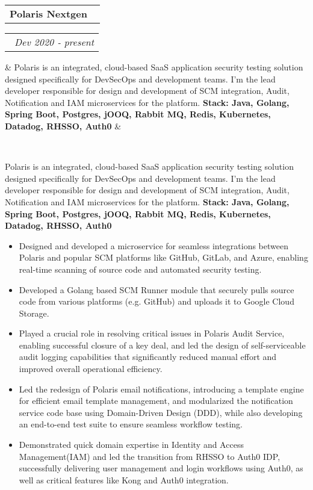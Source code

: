 \documentclass[14pt,a4paper,sans]{moderncv}
\makeatletter
\newcommand*{\customcventry}[7][.13em]{
    \begin{tabular}{@{}l}
    {\bfseries #4} \
        {\itshape #3}
    \end{tabular}
    \hfill
    \begin{tabular}{l@{}}
    {\bfseries #5} \
        {\itshape #2}
    \end{tabular}
    \ifx
        &#7&%
    \else
            {\
        \begin{minipage}{\maincolumnwidth}%
        \small#7%
        \end{minipage}}
    \fi%
    \par\addvspace{#1}}
\makeatother
\begin{document}
    \customcventry{Dev 2020 ‐ present}{}{Polaris Nextgen}{}{}{
            {Polaris is an integrated, cloud-based SaaS application security testing solution designed specifically for DevSecOps and development teams.
        I'm the lead developer responsible for design and development of SCM integration, Audit, Notification and IAM microservices for the platform.\newline{} \newline{}}
            {\textbf{Stack: Java, Golang, Spring Boot, Postgres, jOOQ, Rabbit MQ, Redis, Kubernetes, Datadog, RHSSO, Auth0 }}
    }
            {\begin{itemize}[leftmargin=0.6cm, label={\textbullet}]
                 \item Designed and developed a microservice for seamless integrations between Polaris and popular SCM platforms like GitHub, GitLab, and Azure, enabling real-time scanning of source code and automated security testing.
                 \item Developed a Golang based SCM Runner module that securely pulls source code from various platforms (e.g. GitHub) and uploads it to Google Cloud Storage.
                 \item Played a crucial role in resolving critical issues in Polaris Audit Service, enabling successful closure of a key deal, and led the design of self-serviceable audit logging capabilities that significantly reduced manual effort and improved overall operational efficiency.
                 \item Led the redesign of Polaris email notifications, introducing a template engine for efficient email template management, and modularized the notification service code base using Domain-Driven Design (DDD), while also developing an end-to-end test suite to ensure seamless workflow testing.
                 \item Demonstrated quick domain expertise in Identity and Access Management(IAM) and led the transition from RHSSO to Auth0 IDP, successfully delivering user management and login workflows using Auth0, as well as critical features like Kong and Auth0 integration.
        \end{itemize}}
\end{document}
